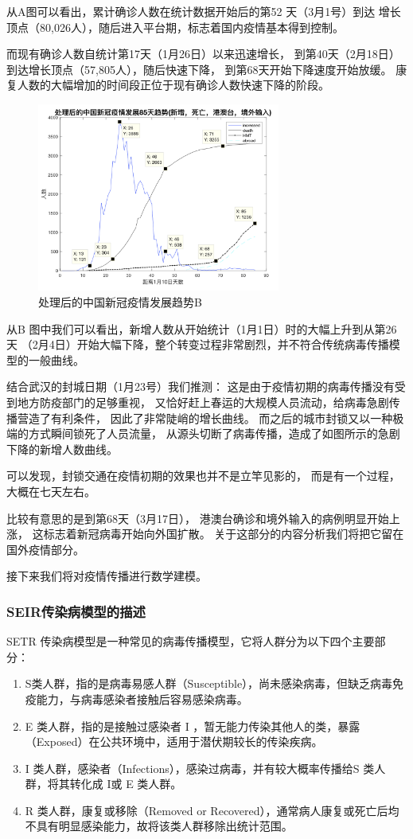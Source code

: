 \documentclass[UTF8]{ctexart}
\begin{document}
从A图可以看出，累计确诊人数在统计数据开始后的第52 天（3月1号）到达
增长顶点（80,026人），随后进入平台期，标志着国内疫情基本得到控制。
\par 
而现有确诊人数自统计第17天（1月26日）以来迅速增长，
到第40天（2月18日）到达增长顶点（57,805人），随后快速下降，
到第68天开始下降速度开始放缓。
康复人数的大幅增加的时间段正位于现有确诊人数快速下降的阶段。
\begin{figure}[htbp][H]
    \centering
    \includegraphics[width=8cm]{4.png} 
    \caption{处理后的中国新冠疫情发展趋势B}
\end{figure}
\par
从B 图中我们可以看出，新增人数从开始统计（1月1日）时的大幅上升到从第26天
（2月4日）开始大幅下降，整个转变过程非常剧烈，并不符合传统病毒传播模型的一般曲线。
\par 
结合武汉的封城日期（1月23号）我们推测：
这是由于疫情初期的病毒传播没有受到地方防疫部门的足够重视，
又恰好赶上春运的大规模人员流动，给病毒急剧传播营造了有利条件，
因此了非常陡峭的增长曲线。
而之后的城市封锁又以一种极端的方式瞬间锁死了人员流量，
从源头切断了病毒传播，造成了如图所示的急剧下降的新增人数曲线。
\par 
可以发现，封锁交通在疫情初期的效果也并不是立竿见影的，
而是有一个过程，大概在七天左右。
\par 
比较有意思的是到第68天（3月17日），
港澳台确诊和境外输入的病例明显开始上涨，
这标志着新冠病毒开始向外国扩散。
关于这部分的内容分析我们将把它留在国外疫情部分。
\par 
接下来我们将对疫情传播进行数学建模。

\subsubsection{SEIR传染病模型的描述}
SETR 传染病模型是一种常见的病毒传播模型，它将人群分为以下四个主要部分：
\begin{enumerate}
    \item S类人群，指的是病毒易感人群（Susceptible），尚未感染病毒，但缺乏病毒免疫能力，与病毒感染者接触后容易感染病毒。
    \item E 类人群，指的是接触过感染者 I ，暂无能力传染其他人的类，暴露（Exposed）在公共环境中，适用于潜伏期较长的传染疾病。
    \item I 类人群，感染者（Infections），感染过病毒，并有较大概率传播给S 类人群，将其转化成 I或 E 类人群。
    \item R 类人群，康复或移除（Removed or Recovered），通常病人康复或死亡后均不具有明显感染能力，故将该类人群移除出统计范围。
\end{enumerate}
\end{document}
